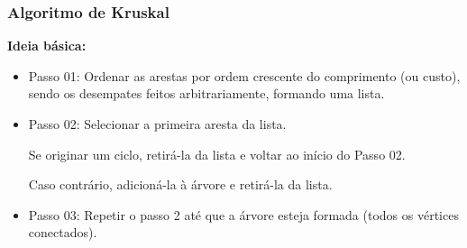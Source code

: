 \documentclass[hyperref={pdfpagelabels=false}]{beamer}
\begin{document}
\begin{frame}
\frametitle{Algoritmo de Kruskal}

{\bf Ideia básica:}
\begin{itemize}
	\item Passo 01: Ordenar as arestas por ordem crescente do comprimento (ou custo), sendo os desempates feitos arbitrariamente, formando uma lista.
	\item Passo 02: Selecionar a primeira aresta da lista.

	Se originar um ciclo, retirá-la da lista e voltar ao início do
	Passo 02.
	
	Caso contrário, adicioná-la à árvore e retirá-la da lista.
	\item Passo 03: Repetir o passo 2 até que a árvore esteja
	formada (todos os vértices conectados).
\end{itemize}
\end{frame}
\end{document}
